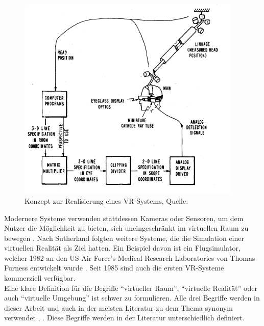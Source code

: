 \documentclass[12pt, a4paper]{article}
\begin{document}
\begin{figure}[h!]
\centering
\includegraphics[width=0.95\textwidth]{Isdale_HMD_concept.png}
\caption[Konzept zur Realisierung eines VR-Systems]{Konzept zur Realisierung eines VR-Systems, Quelle:\protect\cite{sutherland1968head}}
\label{sutherlandHMD}
\end{figure}

Modernere Systeme verwenden stattdessen Kameras oder Sensoren, um dem Nutzer die Möglichkeit zu bieten, sich uneingeschränkt im virtuellen Raum zu bewegen \cite{vive:01}.
Nach Sutherland folgten weitere Systeme, die die Simulation einer virtuellen Realität als Ziel hatten. Ein Beispiel davon ist ein Flugsimulator, welcher 1982 an den US Air Force's Medical Research Laboratories von Thomas Furness entwickelt wurde \cite[S.~2]{mazuryk1996virtual}. Seit 1985 sind auch die ersten VR-Systeme kommerziell verfügbar.\\

Eine klare Definition für die Begriffe "`virtueller Raum"', "`virtuelle Realität"' oder auch "`virtuelle Umgebung"' ist schwer zu formulieren. Alle drei Begriffe werden in dieser Arbeit und auch in der meisten Literatur zu dem Thema synonym verwendet \cite[S.~3ff]{mazuryk1996virtual}, \cite[S.~4]{brooks1992research}. Diese Begriffe  werden in der Literatur unterschiedlich definiert.\\
\end{document}
